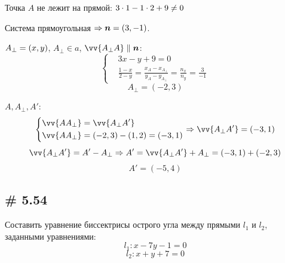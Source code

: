 \documentclass[a4paper,12pt]{article}
\begin{document}
  \begin{solution}
    Точка $A$ не лежит на прямой: $3 \hm\cdot 1 \hm- 1 \hm\cdot 2 \hm+ 9 \hm{\not=0}$
    
    Система прямоугольная $\Rightarrow \bds n \hm= (3, -1)$.
    
    $A_{\perp} \hm=(x, y)$, $A_{\perp} \in a$, $\vv{A_{\perp}A} \hm\parallel \bds n$:
    \[
      \left\{
        \begin{aligned}
          &3x - y + 9 = 0\\
          &\frac{1 - x}{2 - y} = \frac{x_A - x_{A_{\perp}}}{y_A - y_{A_{\perp}}} = \frac{n_x}{n_y} = \frac{3}{-1}
        \end{aligned}
      \right.
    \]
    \[
      \boxed{A_{\perp} = (-2, 3)}
    \]
    
    $A, A_{\perp}, A'$:
    \[
      \left\{\begin{aligned}
        &\vv{A A_{\perp}} = \vv{A_{\perp} A'}\\
        &\vv{A A_{\perp}} = (-2, 3) - (1, 2) = (-3, 1)
      \end{aligned}\right.
      \Rightarrow \vv{A_{\perp} A'} = (-3, 1)
    \]
    \[
      \vv{A_{\perp} A'} = A' - A_{\perp} \Rightarrow A' = \vv{A_{\perp} A'} + A_{\perp}
      = (-3, 1) + (-2, 3)
    \]
    \[
      \boxed{A' = (-5, 4)}
    \]
  \end{solution}
  
  
  \subsection{\# 5.54}
  
  \begin{problem}
    Составить уравнение биссектрисы острого угла между прямыми $l_1$ и $l_2$, заданными уравнениями:
    \[
      l_1\colon x - 7y - 1 = 0
    \]
    \[
      l_2\colon x + y + 7 = 0
    \]
  \end{problem}
  
\end{document}
